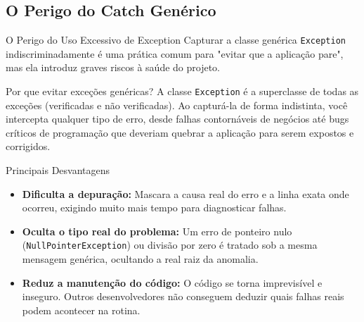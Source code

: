 \documentclass[9pt]{beamer}
\begin{document}
\subsection{O Perigo do Catch Genérico}
\begin{frame}{O Perigo do Uso Excessivo de Exception}
    Capturar a classe genérica \texttt{Exception} indiscriminadamente é uma prática comum para "evitar que a aplicação pare", mas ela introduz graves riscos à saúde do projeto.
    
    \vspace{0.3cm}
    
    \begin{block}{Por que evitar exceções genéricas?}
        A classe \texttt{Exception} é a superclasse de todas as exceções (verificadas e não verificadas). Ao capturá-la de forma indistinta, você intercepta qualquer tipo de erro, desde falhas contornáveis de negócios até bugs críticos de programação que deveriam quebrar a aplicação para serem expostos e corrigidos.
    \end{block}
    
    \begin{block}{Principais Desvantagens}
        \begin{itemize}
            \item \textbf{Dificulta a depuração:} Mascara a causa real do erro e a linha exata onde ocorreu, exigindo muito mais tempo para diagnosticar falhas.
            \item \textbf{Oculta o tipo real do problema:} Um erro de ponteiro nulo (\texttt{NullPointerException}) ou divisão por zero é tratado sob a mesma mensagem genérica, ocultando a real raiz da anomalia.
            \item \textbf{Reduz a manutenção do código:} O código se torna imprevisível e inseguro. Outros desenvolvedores não conseguem deduzir quais falhas reais podem acontecer na rotina.
        \end{itemize}
    \end{block}
\end{frame}
\end{document}
